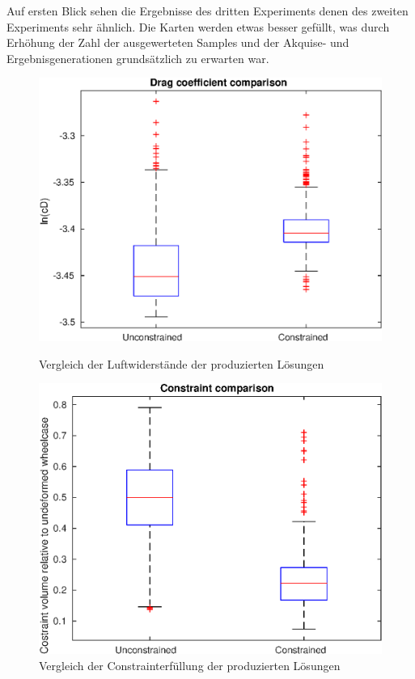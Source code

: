 Auf ersten Blick sehen die Ergebnisse des dritten Experiments denen des zweiten Experiments sehr ähnlich.
Die Karten werden etwas besser gefüllt, was durch Erhöhung der Zahl der ausgewerteten Samples und der Akquise- und Ergebnisgenerationen grundsätzlich zu erwarten war.

\begin{figure}[h]
	\centering
	\begin{minipage}{0.45\textwidth}
		\centering
		\includegraphics[width=1\linewidth]{bilder/6pt1000Samples/dragBoxplot}
		\caption{Vergleich der Luftwiderstände der produzierten Lösungen}
		\label{fig:3rddragbox}
	\end{minipage}\hfill
	\begin{minipage}{0.45\textwidth}
		\centering
		\includegraphics[width=1\linewidth]{bilder/6pt1000Samples/constraintBoxplot}
		\caption{Vergleich der Constrainterfüllung der produzierten Lösungen}
		\label{fig:3rdconbox}
	\end{minipage}
\end{figure}

